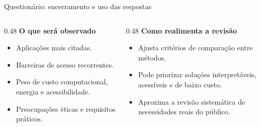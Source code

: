 \documentclass[aspectratio=1610,11pt]{beamer}
\begin{document}
{\begin{frame}[noframenumbering]{Questionário: encerramento e uso das respostas}
    \vspace{0.25cm}
    \begin{columns}[T,onlytextwidth]
        \begin{column}{0.48\textwidth}
            \textbf{O que será observado}
            \begin{itemize}
                \item Aplicações mais citadas.
                \item Barreiras de acesso recorrentes.
                \item Peso de custo computacional, energia e acessibilidade.
                \item Preocupações éticas e requisitos práticos.
            \end{itemize}
        \end{column}
        \begin{column}{0.48\textwidth}
            \textbf{Como realimenta a revisão}
            \begin{itemize}
                \item Ajusta critérios de comparação entre métodos.
                \item Pode priorizar soluções interpretáveis, acessíveis e de baixo custo.
                \item Aproxima a revisão sistemática de necessidades reais do público.
            \end{itemize}
        \end{column}
    \end{columns}
\end{frame}

}
\end{document}
